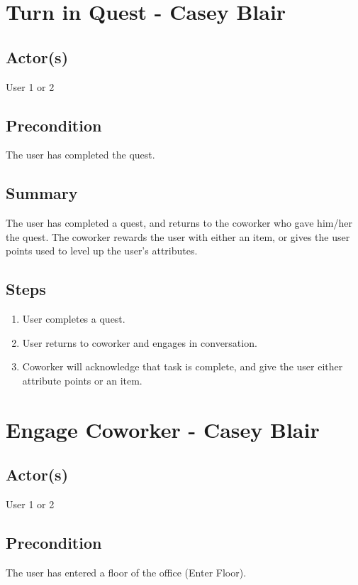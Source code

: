 \documentclass[11pt]{article}
\begin{document}
\section{Turn in Quest - Casey Blair}
	

		\subsection{Actor(s)}
			User 1 or 2
			

		\subsection{Precondition}
				The user has completed the quest.
			
	
		\subsection{Summary}
				The user has completed a quest, and returns to the coworker who gave him/her the quest. The coworker rewards the user with either an item, or gives the user points used to level up the user's attributes.
			\subsection{Steps}
			\begin{enumerate}
			\item User completes a quest.
			\item User returns to coworker and engages in conversation.
			\item Coworker will acknowledge that task is complete, and give the user either attribute points or an item.
			
			\end{enumerate}



\section{Engage Coworker - Casey Blair}
	

		\subsection{Actor(s)}
			User 1 or 2
			

		\subsection{Precondition}
				The user has entered a floor of the office (Enter Floor).
			
\end{document}
